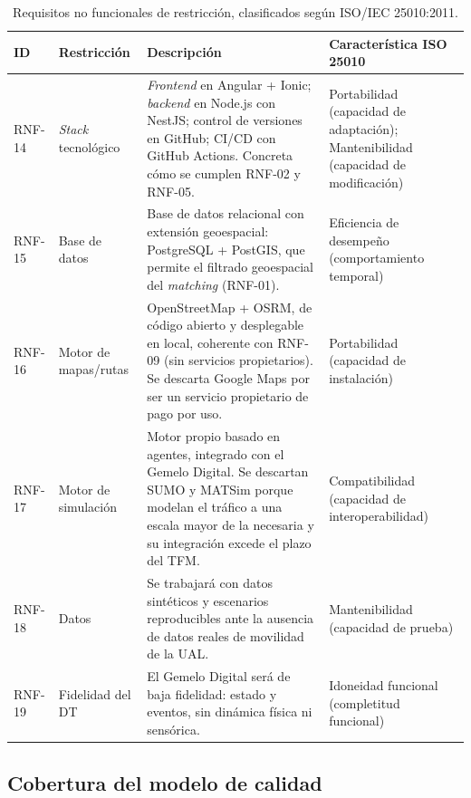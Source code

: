 \setlength{\tabcolsep}{4pt}
\begin{table}[H]
  \centering
  \begin{tabularx}{\textwidth}{@{}Y{0.3200} Y{0.5800} Y{1.3500} Y{0.7500}@{}}
    \hline
    \textbf{ID} & \textbf{Restricción} & \textbf{Descripción} & \textbf{Característica ISO 25010} \\
    \hline
    RNF-14 & \textit{Stack} tecnológico & \textit{Frontend} en Angular + Ionic; \textit{backend} en Node.js con NestJS; control de versiones en GitHub; CI/CD con GitHub Actions. Concreta cómo se cumplen RNF-02 y RNF-05. & Portabilidad (capacidad de adaptación); Mantenibilidad (capacidad de modificación) \\
    RNF-15 & Base de datos & Base de datos relacional con extensión geoespacial: PostgreSQL + PostGIS, que permite el filtrado geoespacial del \textit{matching} (RNF-01). & Eficiencia de desempeño (comportamiento temporal) \\
    RNF-16 & Motor de mapas/rutas & OpenStreetMap + OSRM, de código abierto y desplegable en local, coherente con RNF-09 (sin servicios propietarios). Se descarta Google Maps por ser un servicio propietario de pago por uso. & Portabilidad (capacidad de instalación) \\
    RNF-17 & Motor de simulación & Motor propio basado en agentes, integrado con el Gemelo Digital. Se descartan SUMO y MATSim porque modelan el tráfico a una escala mayor de la necesaria y su integración excede el plazo del TFM. & Compatibilidad (capacidad de interoperabilidad) \\
    RNF-18 & Datos & Se trabajará con datos sintéticos y escenarios reproducibles ante la ausencia de datos reales de movilidad de la UAL. & Mantenibilidad (capacidad de prueba) \\
    RNF-19 & Fidelidad del DT & El Gemelo Digital será de baja fidelidad: estado y eventos, sin dinámica física ni sensórica. & Idoneidad funcional (completitud funcional) \\
    \hline
  \end{tabularx}
  \caption{Requisitos no funcionales de restricción, clasificados según ISO/IEC 25010:2011.}
  \label{tab:restricciones}
\end{table}
\setlength{\tabcolsep}{6pt}

\subsection{Cobertura del modelo de calidad}

